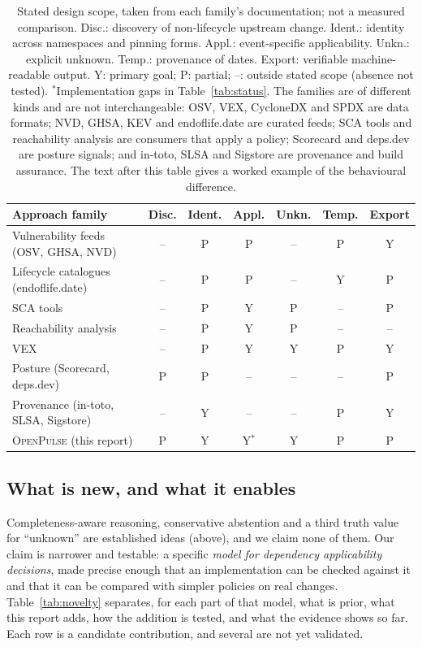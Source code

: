 \documentclass[11pt,a4paper]{article}
\newcommand{\op}{\textsc{OpenPulse}}
\begin{document}
\begin{table}[t]
\centering
\small
\begin{tabularx}{\linewidth}{@{}X cccccc@{}}
\toprule
Approach family & Disc. & Ident. & Appl. & Unkn. & Temp. & Export \\
\midrule
Vulnerability feeds (OSV, GHSA, NVD) & -- & P & P & -- & P & Y \\
Lifecycle catalogues (endoflife.date) & -- & P & P & -- & Y & P \\
SCA tools & -- & P & Y & P & -- & P \\
Reachability analysis~\cite{ponta2018beyond} & -- & P & Y & P & -- & -- \\
VEX~\cite{cisa2023vex,openvex} & -- & P & Y & Y & P & Y \\
Posture (Scorecard, deps.dev) & P & P & -- & -- & -- & P \\
Provenance (in-toto, SLSA, Sigstore) & -- & Y & -- & -- & P & Y \\
\op{} (this report) & P & Y & Y$^*$ & Y & P & P \\
\bottomrule
\end{tabularx}
\caption{Stated design scope, taken from each family's documentation;
not a measured comparison. Disc.: discovery of non-lifecycle upstream
change. Ident.: identity across namespaces and pinning forms. Appl.:
event-specific applicability. Unkn.: explicit unknown. Temp.: provenance
of dates. Export: verifiable machine-readable output. Y: primary goal;
P: partial; --: outside stated scope (absence not tested).
$^*$Implementation gaps in Table~\ref{tab:status}. The families are
of different kinds and are not interchangeable: OSV, VEX, CycloneDX and
SPDX are data formats; NVD, GHSA, KEV and endoflife.date are curated
feeds; SCA tools and reachability analysis are consumers that apply a
policy; Scorecard and deps.dev are posture signals; and in-toto, SLSA
and Sigstore are provenance and build assurance. The text after this
table gives a worked example of the behavioural difference.}
\label{tab:capabilities}
\end{table}

\subsection{What is new, and what it enables}
\label{sec:novelty}

Completeness-aware reasoning, conservative abstention and a third
truth value for ``unknown'' are established ideas (above), and we claim
none of them. Our claim is narrower and testable: a specific
\emph{model for dependency applicability decisions}, made precise
enough that an implementation can be checked against it and that it
can be compared with simpler policies on real changes.
Table~\ref{tab:novelty} separates, for each part of that model, what
is prior, what this report adds, how the addition is tested, and what
the evidence shows so far. Each row is a candidate contribution, and
several are not yet validated.
\end{document}
